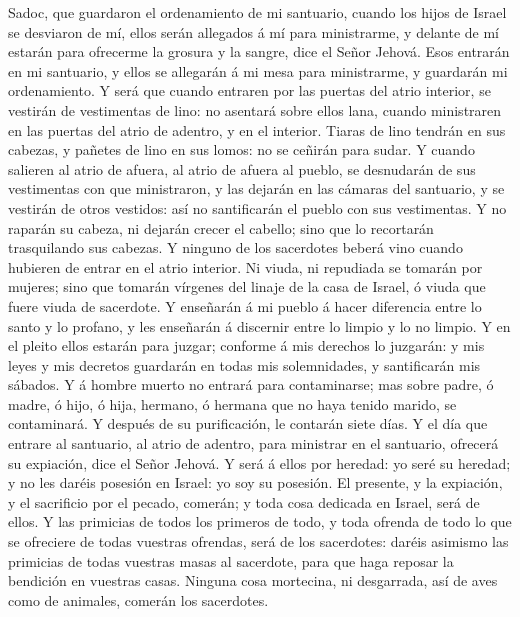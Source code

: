 Sadoc, que guardaron el ordenamiento de mi santuario, cuando los hijos
de Israel se desviaron de mí, ellos serán allegados á mí para
ministrarme, y delante de mí estarán para ofrecerme la grosura y la
sangre, dice el Señor Jehová.  Esos entrarán en mi
santuario, y ellos se allegarán á mi mesa para ministrarme, y guardarán
mi ordenamiento.  Y será que cuando entraren por las
puertas del atrio interior, se vestirán de vestimentas de lino: no
asentará sobre ellos lana, cuando ministraren en las puertas del atrio
de adentro, y en el interior.  Tiaras de lino tendrán en
sus cabezas, y pañetes de lino en sus lomos: no se ceñirán para sudar.
 Y cuando salieren al atrio de afuera, al atrio de afuera
al pueblo, se desnudarán de sus vestimentas con que ministraron, y las
dejarán en las cámaras del santuario, y se vestirán de otros vestidos:
así no santificarán el pueblo con sus vestimentas.  Y no
raparán su cabeza, ni dejarán crecer el cabello; sino que lo recortarán
trasquilando sus cabezas.  Y ninguno de los sacerdotes
beberá vino cuando hubieren de entrar en el atrio interior.
 Ni viuda, ni repudiada se tomarán por mujeres; sino que
tomarán vírgenes del linaje de la casa de Israel, ó viuda que fuere
viuda de sacerdote.  Y enseñarán á mi pueblo á hacer
diferencia entre lo santo y lo profano, y les enseñarán á discernir
entre lo limpio y lo no limpio.  Y en el pleito ellos
estarán para juzgar; conforme á mis derechos lo juzgarán: y mis leyes y
mis decretos guardarán en todas mis solemnidades, y santificarán mis
sábados.  Y á hombre muerto no entrará para contaminarse;
mas sobre padre, ó madre, ó hijo, ó hija, hermano, ó hermana que no haya
tenido marido, se contaminará.  Y después de su
purificación, le contarán siete días.  Y el día que entrare
al santuario, al atrio de adentro, para ministrar en el santuario,
ofrecerá su expiación, dice el Señor Jehová.  Y será á
ellos por heredad: yo seré su heredad; y no les daréis posesión en
Israel: yo soy su posesión.  El presente, y la expiación, y
el sacrificio por el pecado, comerán; y toda cosa dedicada en Israel,
será de ellos.  Y las primicias de todos los primeros de
todo, y toda ofrenda de todo lo que se ofreciere de todas vuestras
ofrendas, será de los sacerdotes: daréis asimismo las primicias de todas
vuestras masas al sacerdote, para que haga reposar la bendición en
vuestras casas.  Ninguna cosa mortecina, ni desgarrada, así
de aves como de animales, comerán los sacerdotes.

